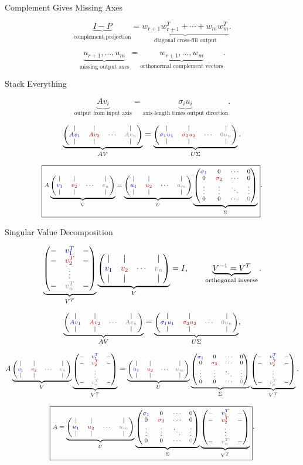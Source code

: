 \documentclass[10pt]{beamer}
\theoremstyle{definition}
\newcommand{\rd}[1]{{\color{red!70!black}#1}}
\newcommand{\bl}[1]{{\color{blue!70!black}#1}}
\newcommand{\gry}[1]{{\color{gray}#1}}
\newcommand{\Vcols}{\begin{pmatrix}|&|& &|\\ \bl{v_1}&\rd{v_2}&\cdots&\gry{v_n}\\ |&|& &|\end{pmatrix}}
\newcommand{\Ucols}{\begin{pmatrix}|&|& &|\\ \bl{u_1}&\rd{u_2}&\cdots&\gry{u_m}\\ |&|& &|\end{pmatrix}}
\newcommand{\Vrows}{\begin{pmatrix}-&\bl{v_1^T}&-\\ -&\rd{v_2^T}&-\\ &\vdots&\\ -&\gry{v_n^T}&-\end{pmatrix}}
\newcommand{\Sigdisplay}{\begin{pmatrix}\bl{\sigma_1}&0&\cdots&0\\ 0&\rd{\sigma_2}&\cdots&0\\ \vdots&\vdots&\ddots&\vdots\\ 0&0&\cdots&\gry{0}\end{pmatrix}}
\begin{document}
\begin{frame}{Complement Gives Missing Axes}

$$
\underbrace{I-P}_{\text{complement projection}}
=
\underbrace{w_{r+1}w_{r+1}^T+\cdots+w_mw_m^T}_{\text{diagonal cross-fill output}}.
$$

\vfill

$$
\underbrace{u_{r+1},\ldots,u_m}_{\text{missing output axes}}
=
\underbrace{w_{r+1},\ldots,w_m}_{\text{orthonormal complement vectors}}.
$$

\end{frame}


\begin{frame}[shrink=12]{Stack Everything}

$$
\underbrace{Av_i}_{\text{output from input axis}}
=
\underbrace{\sigma_i u_i}_{\text{axis length times output direction}}.
$$

\vfill

\[
\scriptsize
\underbrace{
\begin{pmatrix}
|&|& &|\\
\bl{Av_1}&\rd{Av_2}&\cdots&\gry{Av_n}\\
|&|& &|
\end{pmatrix}}_{AV}
=
\underbrace{
\begin{pmatrix}
|&|& &|\\
\bl{\sigma_1u_1}&\rd{\sigma_2u_2}&\cdots&\gry{0u_n}\\
|&|& &|
\end{pmatrix}}_{U\Sigma}.
\]

\[
\scriptsize
\boxed{
A\underbrace{\Vcols}_{V}
=
\underbrace{\Ucols}_{U}
\underbrace{\Sigdisplay}_{\Sigma}
}.
\]

\end{frame}


\begin{frame}[shrink=20]{Singular Value Decomposition}

$$
\underbrace{\Vrows}_{V^T}
\underbrace{\Vcols}_{V}
=I,
\qquad
\underbrace{V^{-1}=V^T}_{\text{orthogonal inverse}}.
$$

\vfill

\[
\scriptsize
\underbrace{
\begin{pmatrix}
|&|& &|\\
\bl{Av_1}&\rd{Av_2}&\cdots&\gry{Av_n}\\
|&|& &|
\end{pmatrix}}_{AV}
=
\underbrace{
\begin{pmatrix}
|&|& &|\\
\bl{\sigma_1u_1}&\rd{\sigma_2u_2}&\cdots&\gry{0u_n}\\
|&|& &|
\end{pmatrix}}_{U\Sigma},
\]

\[
\scriptsize
A
\underbrace{\Vcols}_{V}
\underbrace{\Vrows}_{V^T}
=
\underbrace{\Ucols}_{U}
\underbrace{\Sigdisplay}_{\Sigma}
\underbrace{\Vrows}_{V^T}.
\]

\[
\scriptsize
\boxed{
A=
\underbrace{\Ucols}_{U}
\underbrace{\Sigdisplay}_{\Sigma}
\underbrace{\Vrows}_{V^T}
}.
\]

\end{frame}
\end{document}

